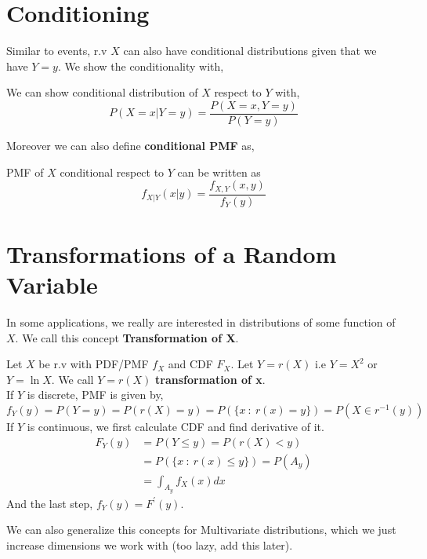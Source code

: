 \section{Conditioning}
Similar to events, r.v $X$ can also have conditional distributions given that we have $Y=y$. We show the conditionality with,
\begin{definition}
    We can show conditional distribution of $X$ respect to $Y$ with,
    \[P(X=x| Y=y) = \frac{ P(X=x,Y=y)}{P(Y=y)} \]
\end{definition}
Moreover we can also define \textbf{conditional PMF} as,
\begin{definition}
    PMF of $X$ conditional respect to $Y$ can be written as
    \[ f_{X|Y}(x|y)= \frac{f_{X,Y}(x,y)}{f_Y(y)}\]
\end{definition}

\section{Transformations of a Random Variable}
In some applications, we really are interested in distributions of some function of $X$. We call this concept \textbf{Transformation of X}.
\begin{definition}
    Let $X$ be r.v with PDF/PMF $f_X$ and CDF $F_X$. Let $Y=r(X)$ i.e $Y=X^2$ or $Y = \ln X$. We call $Y=r(X)$ \textbf{transformation of x}. \\
    \newline
    If $Y$ is discrete, PMF is given by,
    \[f_Y(y)= P(Y=y) =  P( r(X) = y) = P( \{x \ : \ r(x) = y\})= P( X \in r^{-1}(y)) \]
    \newline
    If $Y$ is continuous, we first calculate CDF and find derivative of it.
    \begin{align*}
        F_Y(y) &= P( Y \le y) = P(r(X) < y) \\
        &= P(\{x \ : \ r(x) \le y \}) = P( A_y)    \\
        &= \int_{A_y} f_X(x)dx
    \end{align*}
    And the last step, $f_Y(y) = F^{'}(y)$.
\end{definition}
We can also generalize this concepts for Multivariate distributions, which we just increase dimensions we work with (too lazy, add this later).
